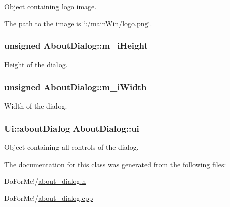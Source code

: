 Object containing logo image. 

The path to the image is \char`\"{}\-:/main\-Win/logo.\-png\char`\"{}. \hypertarget{class_about_dialog_a66a8aa7f00755ed127b3bdfa1da0912c}{
\subsubsection[{m\-\_\-i\-Height}]{\setlength{\rightskip}{0pt plus 5cm}unsigned About\-Dialog\-::m\-\_\-i\-Height\hspace{0.3cm}{\ttfamily [private]}}}\label{class_about_dialog_a66a8aa7f00755ed127b3bdfa1da0912c}


Height of the dialog. 

\hypertarget{class_about_dialog_a57772dce12e9b11f8b77488c4bfd9502}{
\subsubsection[{m\-\_\-i\-Width}]{\setlength{\rightskip}{0pt plus 5cm}unsigned About\-Dialog\-::m\-\_\-i\-Width\hspace{0.3cm}{\ttfamily [private]}}}\label{class_about_dialog_a57772dce12e9b11f8b77488c4bfd9502}


Width of the dialog. 

\hypertarget{class_about_dialog_a09973e2e1adc7a6ee6271d2c6f67796a}{
\subsubsection[{ui}]{\setlength{\rightskip}{0pt plus 5cm}Ui\-::about\-Dialog About\-Dialog\-::ui\hspace{0.3cm}{\ttfamily [private]}}}\label{class_about_dialog_a09973e2e1adc7a6ee6271d2c6f67796a}


Object containing all controls of the dialog. 



The documentation for this class was generated from the following files\-:\begin{DoxyCompactItemize}
\item 
Do\-For\-Me!/\hyperlink{about__dialog_8h}{about\-\_\-dialog.\-h}\item 
Do\-For\-Me!/\hyperlink{about__dialog_8cpp}{about\-\_\-dialog.\-cpp}\end{DoxyCompactItemize}
